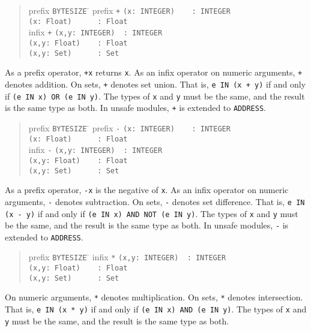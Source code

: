\documentclass[10pt]{article}
\begin{document}
\begin{quote}
  \begin{tabbing}
    prefix \= \verb|BYTESIZE| \= \kill
    prefix \> \verb|+|       \> \verb|(x: INTEGER)    : INTEGER| \\
           \>                \> \verb|(x: Float)      : Float| \\
    infix  \> \verb|+|       \> \verb|(x,y: INTEGER)  : INTEGER| \\
           \>                \> \verb|(x,y: Float)    : Float| \\
           \>                \> \verb|(x,y: Set)      : Set|
  \end{tabbing}
\end{quote}
As a prefix operator, \verb|+x| returns \verb|x|.  As an infix operator on
numeric arguments, \verb|+| denotes addition.  On sets, \verb|+| denotes set
union.  That is, \verb|e IN (x + y)| if and only if
\verb|(e IN x) OR (e IN y)|.  The types of \verb|x| and \verb|y| must be the
same, and the result is the same type as both.  In unsafe modules, \verb|+| is
extended to \verb|ADDRESS|.

\begin{quote}
  \begin{tabbing}
    prefix \= \verb|BYTESIZE| \= \kill
    prefix \> \verb|-|       \> \verb|(x: INTEGER)    : INTEGER| \\
           \>                \> \verb|(x: Float)      : Float| \\
    infix  \> \verb|-|       \> \verb|(x,y: INTEGER)  : INTEGER| \\
           \>                \> \verb|(x,y: Float)    : Float| \\
           \>                \> \verb|(x,y: Set)      : Set|
  \end{tabbing}
\end{quote}
As a prefix operator, \verb|-x| is the negative of \verb|x|.  As an infix
operator on numeric arguments, \verb|-| denotes subtraction.  On sets,
\verb|-| denotes set difference.  That is, \verb|e IN (x - y)| if and only if
\verb|(e IN x) AND NOT (e IN y)|.  The types of \verb|x| and \verb|y| must be
the same, and the result is the same type as both.  In unsafe modules,
\verb|-| is extended to \verb|ADDRESS|.

\begin{quote}
  \begin{tabbing}
    prefix \= \verb|BYTESIZE| \= \kill
    infix  \> \verb|*|       \> \verb|(x,y: INTEGER)  : INTEGER| \\
           \>                \> \verb|(x,y: Float)    : Float| \\
           \>                \> \verb|(x,y: Set)      : Set|
  \end{tabbing}
\end{quote}
On numeric arguments, \verb|*| denotes multiplication.  On sets, \verb|*|
denotes intersection.  That is, \verb|e IN (x * y)| if and only if
\verb|(e IN x) AND (e IN y)|.  The types of \verb|x| and \verb|y| must be the
same, and the result is the same type as both.
\end{document}
